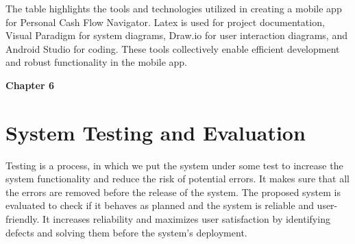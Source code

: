 \documentclass[12pt]{article}
\begin{document}
\noindent
\normalsize The table highlights the tools and technologies utilized in creating a mobile app for Personal Cash Flow Navigator. Latex is used for project documentation, Visual Paradigm for system diagrams,
Draw.io for user interaction diagrams, and Android Studio for coding. These tools
collectively enable efficient development and robust functionality in the mobile app.
\vspace{0.5cm}
\begin{table}[h!]
\centering
{}

\begin{center}
    \caption{Tools and Technology}
\end{center}
\vspace{0.5 cm}
\end{table}
\newpage


\noindent
\LARGE \textbf{Chapter 6}

\vspace{1 cm}

\noindent
\section{System Testing and Evaluation}

\vspace{0.5cm} %

\noindent
\normalsize Testing is a process, in which we put the system under some test to increase the system functionality and reduce the risk of potential errors. It makes sure that all the errors are removed before the release of the system. The proposed system is evaluated to check if it behaves as planned and the system is reliable and user-friendly. It increases reliability and maximizes user satisfaction by identifying defects and solving them before the system's deployment.\cite{chandini2019online}
\vspace{0.5cm} %
\end{document}
